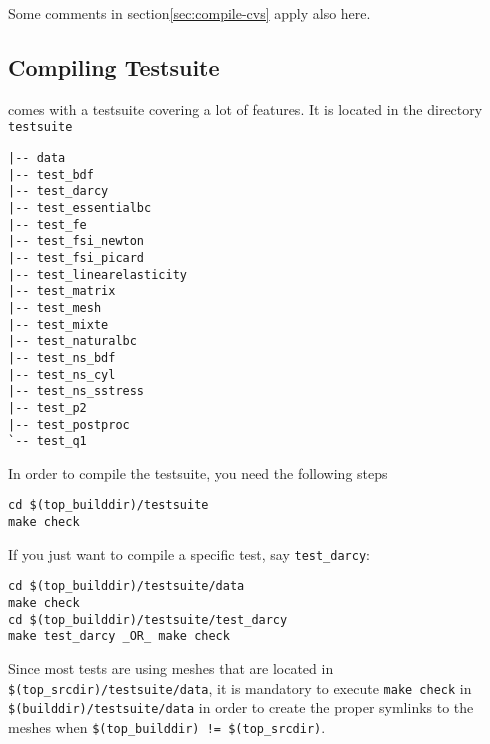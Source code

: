 Some comments in section\ref{sec:compile-cvs} apply also here.

\subsection{Compiling Testsuite}

\noindent \lifev comes with a testsuite covering a lot of features. It is located in the directory \verb+testsuite+
\begin{verbatim}
|-- data
|-- test_bdf
|-- test_darcy
|-- test_essentialbc
|-- test_fe
|-- test_fsi_newton
|-- test_fsi_picard
|-- test_linearelasticity
|-- test_matrix
|-- test_mesh
|-- test_mixte
|-- test_naturalbc
|-- test_ns_bdf
|-- test_ns_cyl
|-- test_ns_sstress
|-- test_p2
|-- test_postproc
`-- test_q1
\end{verbatim}

\noindent In order to compile the testsuite, you need the following steps
\begin{verbatim}
cd $(top_builddir)/testsuite
make check
\end{verbatim}

\noindent If you just want to compile a specific test, say \verb+test_darcy+:
\begin{verbatim}
cd $(top_builddir)/testsuite/data
make check
cd $(top_builddir)/testsuite/test_darcy
make test_darcy _OR_ make check
\end{verbatim}

\noindent Since most tests are using meshes that are located in
\verb+$(top_srcdir)/testsuite/data+, it is mandatory to execute \verb+make check+ in
\verb+$(builddir)/testsuite/data+ in order to create the proper
symlinks to the meshes when \verb+$(top_builddir) != $(top_srcdir)+.

%
%
